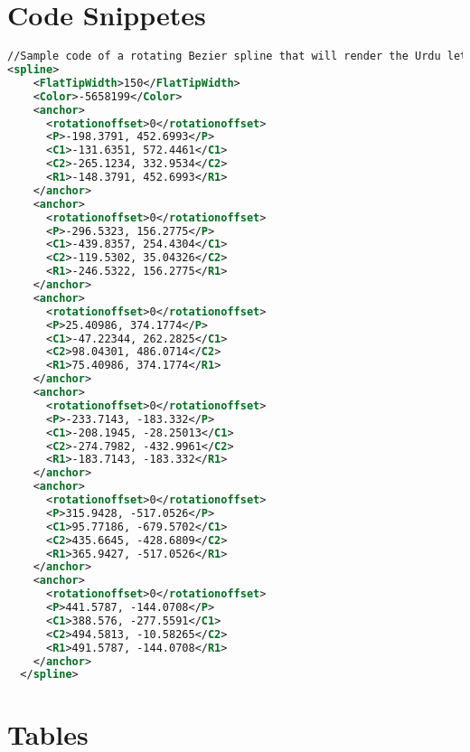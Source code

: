 \appendix
\section{Code Snippetes}
{
\begin{lstlisting}[language=XML]
//Sample code of a rotating Bezier spline that will render the Urdu letter Aa'en in Nastaleeq.
<spline>
    <FlatTipWidth>150</FlatTipWidth>
    <Color>-5658199</Color>
    <anchor>
      <rotationoffset>0</rotationoffset>
      <P>-198.3791, 452.6993</P>
      <C1>-131.6351, 572.4461</C1>
      <C2>-265.1234, 332.9534</C2>
      <R1>-148.3791, 452.6993</R1>
    </anchor>
    <anchor>
      <rotationoffset>0</rotationoffset>
      <P>-296.5323, 156.2775</P>
      <C1>-439.8357, 254.4304</C1>
      <C2>-119.5302, 35.04326</C2>
      <R1>-246.5322, 156.2775</R1>
    </anchor>
    <anchor>
      <rotationoffset>0</rotationoffset>
      <P>25.40986, 374.1774</P>
      <C1>-47.22344, 262.2825</C1>
      <C2>98.04301, 486.0714</C2>
      <R1>75.40986, 374.1774</R1>
    </anchor>
    <anchor>
      <rotationoffset>0</rotationoffset>
      <P>-233.7143, -183.332</P>
      <C1>-208.1945, -28.25013</C1>
      <C2>-274.7982, -432.9961</C2>
      <R1>-183.7143, -183.332</R1>
    </anchor>
    <anchor>
      <rotationoffset>0</rotationoffset>
      <P>315.9428, -517.0526</P>
      <C1>95.77186, -679.5702</C1>
      <C2>435.6645, -428.6809</C2>
      <R1>365.9427, -517.0526</R1>
    </anchor>
    <anchor>
      <rotationoffset>0</rotationoffset>
      <P>441.5787, -144.0708</P>
      <C1>388.576, -277.5591</C1>
      <C2>494.5813, -10.58265</C2>
      <R1>491.5787, -144.0708</R1>
    </anchor>
  </spline>
\end{lstlisting}
}
\section{Tables}
